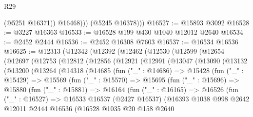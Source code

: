 \begin{lexlean}{R29}
\begin{coremodule}
                (@5251 @16371))
              @16468)))
        (@5245 @16378)))
@16527 := @15893 @3092
@16528 := @3227 @16363
@16533 := @16528 @199 @430 @1040 @12012 @2640
@16534 := @2452 @2444
@16536 := @2452 @16308 @7603
@16537 := @16534 @16536
@16625 := @12313
    (@12342
      (@12392
        (@12462
          (@12530
            (@12599
              (@12654
                (@12697
                  (@12753
                    (@12812
                      (@12856
                        (@12921
                          (@12991
                            (@13047
                              (@13090
                                (@13132
                                  (@13200
                                    (@13264
                                      (@14318
                                        (@14685
                                          (fun ("_" : @14686) =>
                                          @15428
                                            (fun ("_" : @15429) =>
                                            @15569
                                              (fun ("_" : @15570) =>
                                              @15695
                                                (fun ("_" : @15696) =>
                                                @15880
                                                  (fun ("_" : @15881) =>
                                                  @16164
                                                    (fun ("_" : @16165) =>
                                                    @16526
                                                      (fun ("_" : @16527) =>
                                                      @16533
                                                        @16537
                                                        (@2427 @16537)
                                                        (@16393
                                                          @1038
                                                          @998
                                                          @2642
                                                          @12011
                                                          @2444
                                                          @16536
                                                          (@16528
                                                            @1035
                                                            @20
                                                            @158
                                                            @2640

\end{coremodule}
\end{lexlean}
